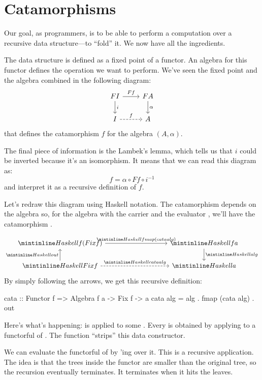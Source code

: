 \documentclass[DaoFP]{subfiles}
\begin{document}
\section{Catamorphisms}

Our goal, as programmers, is to be able to perform a computation over a recursive data structure---to ``fold'' it. We now have all the ingredients. 

The data structure is defined as a fixed point of a functor. An algebra for this functor defines the operation we want to perform. We've seen the fixed point and the algebra combined in the following diagram:
\[
 \begin{tikzcd}
 F I 
 \arrow[r, "F f"]
 \arrow[d, "i"]
 & F A
\arrow[d, "\alpha"]
 \\
 I
 \arrow[r, dashed, "f"]
 & A
  \end{tikzcd}
\]
that defines the catamorphism $f$ for the algebra $(A, \alpha)$.

The final piece of information is the Lambek's lemma, which tells us that $i$ could be inverted because it's an isomorphism. It means that we can read this diagram as:
\[ f = \alpha \circ F f \circ i^{-1} \]
and interpret it as a recursive definition of $f$. 

Let's redraw this diagram using Haskell notation. The catamorphism depends on the algebra so, for the algebra with the carrier  and the evaluator , we'll have the catamorphism .

\[
 \begin{tikzcd}
  \hask{f (Fix f)}
 \arrow[rrrr, "\hask{fmap (cata alg)}"]
 &&&& \hask{f a}
\arrow[d, "\hask{alg}"]
 \\
 \hask{Fix f}
 \arrow[u, "\hask{out}"]
 \arrow[rrrr, dashed, "\hask{cata alg}"]
 &&&& \hask{a}
  \end{tikzcd}
\]
By simply following the arrows, we get this recursive definition:
\begin{haskell}
cata :: Functor f => Algebra f a -> Fix f -> a
cata alg = alg . fmap (cata alg) . out
\end{haskell}

Here's what's happening:  is applied to some . Every  is obtained by applying  to a functorful of . The function  ``strips'' this data constructor. 

We can evaluate the functorful of  by 'ing  over it. This is a recursive application. The idea is that the trees inside the functor are smaller than the original tree, so the recursion eventually terminates. It terminates when it hits the leaves. 
\end{document}
